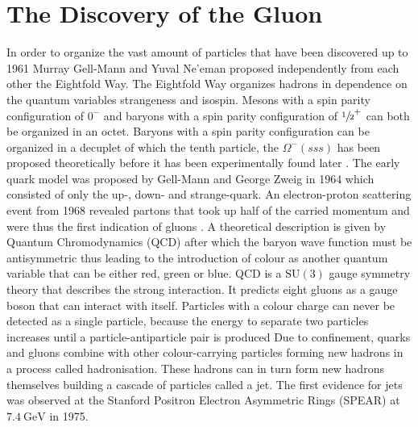 \chapter{The Discovery of the Gluon}

In order to organize the vast amount of particles that have been discovered up to 1961 Murray Gell-Mann and Yuval Ne'eman proposed independently from each other the Eightfold Way.
The Eightfold Way organizes hadrons in dependence on the quantum variables strangeness and isospin. 
Mesons with a spin parity configuration of $0^-$ and baryons with a spin parity configuration of $\sfrac 12^+$ can both be organized in an octet.
Baryons with a spin parity configuration can be organized in a decuplet of which the tenth particle, the $\Omega^-(sss)$ has been proposed theoretically before it has been experimentally found later \cite{Fritzsch2018}.
The early quark model was proposed by Gell-Mann and George Zweig in 1964 which consisted of only the up-, down- and strange-quark.
An electron-proton scattering event from 1968 revealed partons that took up half of the carried momentum and were thus the first indication of gluons \cite{Venker}.
A theoretical description is given by Quantum Chromodynamics (QCD) after which the baryon wave function must be antisymmetric thus leading to the introduction of colour as another quantum variable that can be either red, green or blue.
QCD is a $\text{SU}(3)$ gauge symmetry theory that describes the strong interaction.
It predicts eight gluons as a gauge boson that can interact with itself.
Particles with a colour charge can never be detected as a single particle, because the energy to separate two particles increases until a particle-antiparticle pair is produced
Due to confinement, quarks and gluons combine with other colour-carrying particles forming new hadrons in a process called hadronisation.
These hadrons can in turn form new hadrons themselves building a cascade of particles called a jet.
The first evidence for jets was observed at the Stanford Positron Electron Asymmetric Rings (SPEAR) at $\SI{7.4}{\giga\eV}$ in 1975.